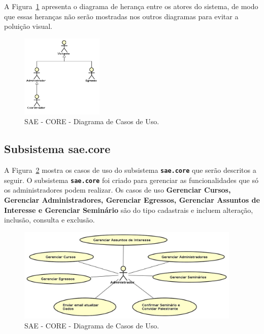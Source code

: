 	
A Figura~\ref{fig-requisitos-diagrama-atores} apresenta o diagrama de herança entre os atores do sistema, de modo que essas heranças não serão mostradas nos outros diagramas para evitar a poluição visual.
\begin{figure}[h]
	\centering
	\includegraphics[width=0.35\textwidth]{figuras/requisitos/atoresHeranca}
	\caption{SAE - CORE - Diagrama de Casos de Uso.}
	\label{fig-requisitos-diagrama-atores}
\end{figure}

	
\newpage	
\subsection{Subsistema sae.core}
\label{sec-requisitos-casos-de-uso-core}

A Figura~\ref{fig-requisitos-core-diagrama-casos-uso} mostra os casos de uso do subsistema \textbf{\texttt{sae.core}} que serão descritos a seguir. O subsistema \textbf{\texttt{sae.core}} foi criado para gerenciar as funcionalidades que só os administradores podem realizar. Os casos de uso \textbf{Gerenciar Cursos, Gerenciar Administradores, Gerenciar Egressos, Gerenciar Assuntos de Interesse e Gerenciar Seminário } são do tipo cadastrais e incluem alteração, inclusão, consulta e exclusão. 

\begin{figure}[h]
	\centering
	\includegraphics[width=0.95\textwidth]{figuras/requisitos/casodeuso-core}
	\caption{SAE - CORE - Diagrama de Casos de Uso.}
	\label{fig-requisitos-core-diagrama-casos-uso}
\end{figure}


